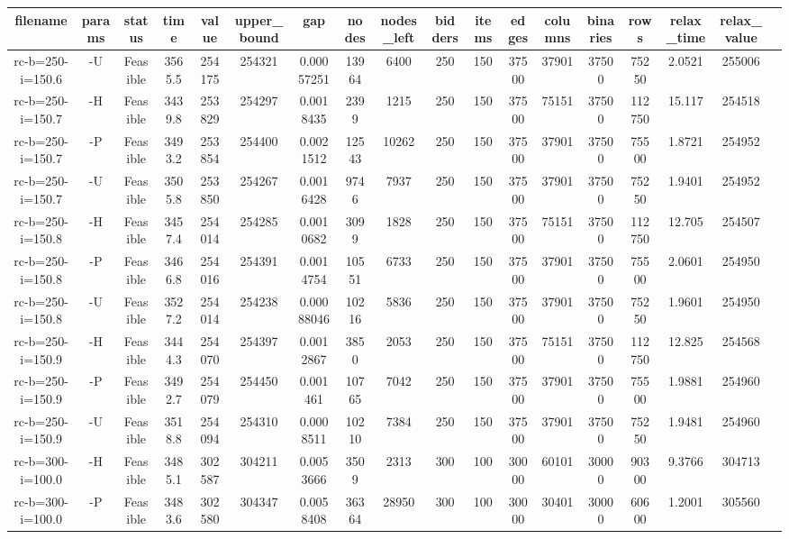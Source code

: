 \documentclass[landscape, a4paper]{article}
\begin{document}
\begin{center}
\begin{tabular}{@{}cccccccccccccccccc@{}}
filename & params & status & time & value & upper\_bound & gap & nodes & nodes\_left & bidders & items & edges & columns & binaries & rows & relax\_time & relax\_value & \\
\hline
rc-b=250-i=150.6 & -U & Feasible & 3565.5 & 254175 & 254321 & 0.00057251 & 13964 & 6400 & 250 & 150 & 37500 & 37901 & 37500 & 75250 & 2.0521 & 255006 & \\
rc-b=250-i=150.7 & -H & Feasible & 3439.8 & 253829 & 254297 & 0.0018435 & 2399 & 1215 & 250 & 150 & 37500 & 75151 & 37500 & 112750 & 15.117 & 254518 & \\
rc-b=250-i=150.7 & -P & Feasible & 3493.2 & 253854 & 254400 & 0.0021512 & 12543 & 10262 & 250 & 150 & 37500 & 37901 & 37500 & 75500 & 1.8721 & 254952 & \\
rc-b=250-i=150.7 & -U & Feasible & 3505.8 & 253850 & 254267 & 0.0016428 & 9746 & 7937 & 250 & 150 & 37500 & 37901 & 37500 & 75250 & 1.9401 & 254952 & \\
rc-b=250-i=150.8 & -H & Feasible & 3457.4 & 254014 & 254285 & 0.0010682 & 3099 & 1828 & 250 & 150 & 37500 & 75151 & 37500 & 112750 & 12.705 & 254507 & \\
rc-b=250-i=150.8 & -P & Feasible & 3466.8 & 254016 & 254391 & 0.0014754 & 10551 & 6733 & 250 & 150 & 37500 & 37901 & 37500 & 75500 & 2.0601 & 254950 & \\
rc-b=250-i=150.8 & -U & Feasible & 3527.2 & 254014 & 254238 & 0.00088046 & 10216 & 5836 & 250 & 150 & 37500 & 37901 & 37500 & 75250 & 1.9601 & 254950 & \\
rc-b=250-i=150.9 & -H & Feasible & 3444.3 & 254070 & 254397 & 0.0012867 & 3850 & 2053 & 250 & 150 & 37500 & 75151 & 37500 & 112750 & 12.825 & 254568 & \\
rc-b=250-i=150.9 & -P & Feasible & 3492.7 & 254079 & 254450 & 0.001461 & 10765 & 7042 & 250 & 150 & 37500 & 37901 & 37500 & 75500 & 1.9881 & 254960 & \\
rc-b=250-i=150.9 & -U & Feasible & 3518.8 & 254094 & 254310 & 0.0008511 & 10210 & 7384 & 250 & 150 & 37500 & 37901 & 37500 & 75250 & 1.9481 & 254960 & \\
rc-b=300-i=100.0 & -H & Feasible & 3485.1 & 302587 & 304211 & 0.0053666 & 3509 & 2313 & 300 & 100 & 30000 & 60101 & 30000 & 90300 & 9.3766 & 304713 & \\
rc-b=300-i=100.0 & -P & Feasible & 3483.6 & 302580 & 304347 & 0.0058408 & 36364 & 28950 & 300 & 100 & 30000 & 30401 & 30000 & 60600 & 1.2001 & 305560 & \\

\end{tabular}
\end{center}
\end{document}
